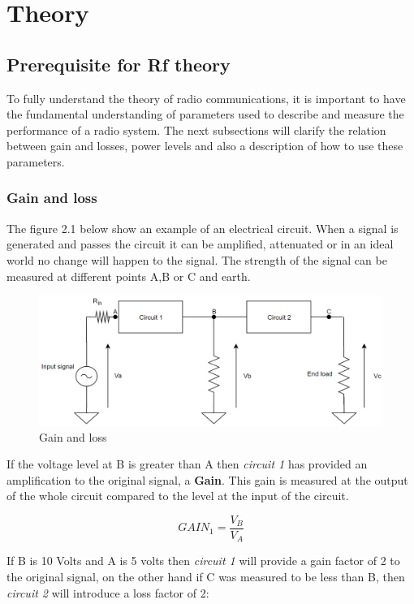 \chapter{Theory}

\section{Prerequisite for Rf theory}
To fully understand the theory of radio communications, it is important to have the fundamental understanding of parameters used to describe and measure the performance of a radio system. The next subsections will clarify the relation between gain and losses, power levels and also a description of how to use these parameters.

\subsection{Gain and loss}
The figure 2.1 below show an example of an electrical circuit. When a signal is generated and passes the circuit it can be amplified, attenuated or in an ideal world no change will happen to the signal. The strength of the signal can be measured at different points A,B or C and earth. 

\begin{figure}[h]
\centering
\includegraphics[scale=0.5]{figures/GainLoss.PNG}
\caption{Gain and loss}
\end{figure}

If the voltage level at B is greater than A then \textit{circuit 1} has provided an amplification to the original signal, a \textbf{Gain}. This gain is measured at the output of the whole circuit compared to the level at the input of the circuit.

$$GAIN_1 = \frac{V_B}{V_A}$$

If B is 10 Volts and A is 5 volts then \textit{circuit 1} will provide a gain factor of 2 to the original signal, on the other hand if C was measured to be less than B, then \textit{circuit 2} will introduce a loss factor of 2:

